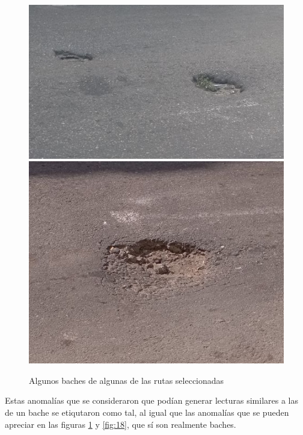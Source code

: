 		\begin{figure}[htb]
			\centering
			\includegraphics[scale = 0.3]{Graphics/pothole_7.jpg}
			\includegraphics[scale = 0.3]{Graphics/pothole_8.jpg}
			\caption{Algunos baches de algunas de las rutas seleccionadas}
			\label{fig:17}
		\end{figure}
		\newpage

		Estas anomalías que se consideraron que podían generar lecturas	similares a las de un bache se etiqutaron como tal, al igual que las anomalías que se 
		pueden apreciar en las figuras \ref{fig:17} y \ref{fig:18}, que sí son realmente baches.

